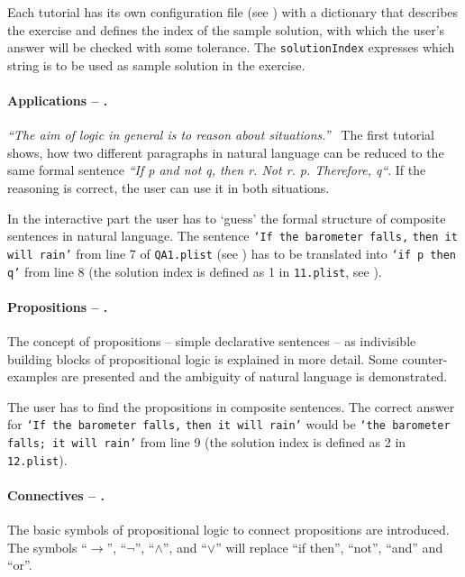 Each tutorial has its own configuration file 
(see )
with a dictionary that
describes the exercise and defines the index of the sample solution,
with which the user's answer will be checked with some tolerance.
The \verb+solutionIndex+ expresses which string 
is to be used as sample solution in the exercise.

\paragraph{Applications – .}
\label{tut:11}
{\em{}“The aim of logic in general is to reason about situations.”}\ \cite{Huth:2004:LCS:975331} 
The first tutorial shows, how two different paragraphs in natural language 
can be reduced to the same formal sentence {\em“If p and not q, then r. Not r. p. Therefore, q“}. 
If the reasoning is correct, the user can use it in both situations. 

In the interactive part the user has to ‘guess’ the formal structure of composite sentences in natural language. 
The sentence 
\verb+‘If the barometer falls,+ \verb+then it will rain’+ 
from line 7 of \verb+QA1.plist+ (see )
has to be translated into
\verb+‘if p then q’+ from line 8 (the solution index is defined as 1 in \verb+11.plist+, see ).

\paragraph{Propositions – .}
\label{tut:12}

The concept of propositions – simple declarative sentences – 
as indivisible building blocks of propositional logic 
is explained in more detail. Some counter-examples are presented 
and the ambiguity of natural language is demonstrated.

The user has to find the propositions in composite sentences. 
The correct answer for 
\verb+‘If the barometer falls,+ \verb+then it will rain’+ 
would be  
\verb+‘the barometer falls; it will rain’+ 
from line 9 
(the solution index is defined as 2 in \verb+12.plist+).


\paragraph{Connectives – .}
\label{tut:13}
The basic symbols of propositional logic to connect propositions are introduced. 
The symbols “$\rightarrow$”, “$\neg$”, “$\wedge$”, and “$\vee$”
 will replace “if then”, “not”, “and” and “or”. 

